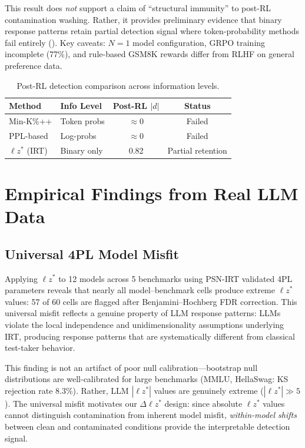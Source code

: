 \documentclass[11pt,a4paper]{article}
\begin{document}
This result does \emph{not} support a claim of ``structural immunity'' to post-RL contamination washing.
Rather, it provides preliminary evidence that binary response patterns retain partial detection signal where token-probability methods fail entirely ().
Key caveats: $N{=}1$ model configuration, GRPO training incomplete (77\%), and rule-based GSM8K rewards differ from RLHF on general preference data.

\begin{table}[t]
\centering
\caption{Post-RL detection comparison across information levels.}
\label{tab:post-rl-comparison}
\small
\begin{tabular}{llcc}
\toprule
\textbf{Method} & \textbf{Info Level} & \textbf{Post-RL} $|d|$ & \textbf{Status} \\
\midrule
Min-K\%++ & Token probs & $\approx 0$ & Failed \\
PPL-based & Log-probs & $\approx 0$ & Failed \\
$\ell z^*$ (IRT) & Binary only & 0.82 & Partial retention \\
\bottomrule
\end{tabular}
\end{table}

\section{Empirical Findings from Real LLM Data}
\label{sec:empirical}

\subsection{Universal 4PL Model Misfit}

Applying $\ell z^*$ to 12 models across 5 benchmarks using PSN-IRT \citep{psnirt2026} validated 4PL parameters reveals that nearly all model--benchmark cells produce extreme $\ell z^*$ values: 57 of 60 cells are flagged after Benjamini--Hochberg FDR correction.
This universal misfit reflects a genuine property of LLM response patterns: LLMs violate the local independence and unidimensionality assumptions underlying IRT, producing response patterns that are systematically different from classical test-taker behavior.

This finding is not an artifact of poor null calibration---bootstrap null distributions are well-calibrated for large benchmarks (MMLU, HellaSwag: KS rejection rate 8.3\%).
Rather, LLM $|\ell z^*|$ values are genuinely extreme ($|\ell z^*| \gg 5$).
The universal misfit motivates our $\Delta \ell z^*$ design: since absolute $\ell z^*$ values cannot distinguish contamination from inherent model misfit, \emph{within-model shifts} between clean and contaminated conditions provide the interpretable detection signal.
\end{document}
